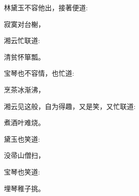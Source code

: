 \begin{parag}
    林黛玉不容他出，接著便道:
\end{parag}


\begin{poem}
    \begin{pl} 寂寞对台榭，\end{pl}
\end{poem}


\begin{parag}
    湘云忙联道:
\end{parag}


\begin{poem}
    \begin{pl} 清贫怀箪瓢。\end{pl}
\end{poem}


\begin{parag}
    宝琴也不容情，也忙道:
\end{parag}


\begin{poem}
    \begin{pl} 烹茶冰渐沸，\end{pl}
\end{poem}


\begin{parag}
    湘云见这般，自为得趣，又是笑，又忙联道:
\end{parag}


\begin{poem}
    \begin{pl} 煮酒叶难烧。\end{pl}
\end{poem}


\begin{parag}
    黛玉也笑道:
\end{parag}


\begin{poem}
    \begin{pl} 没帚山僧扫，\end{pl}
\end{poem}


\begin{parag}
    宝琴也笑道:
\end{parag}


\begin{poem}
    \begin{pl} 埋琴稚子挑。\end{pl}
\end{poem}


